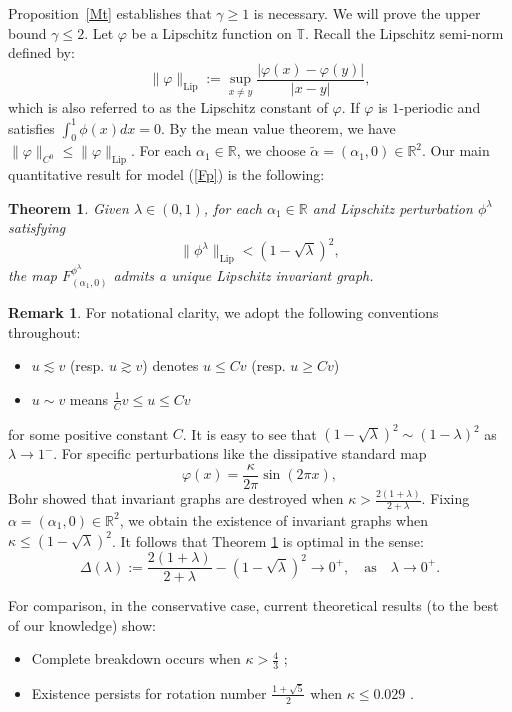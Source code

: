 \documentclass{amsart}
\newcommand{\R}{\mathbb{R}}
\newcommand{\al}{\alpha}
\newcommand{\T}{\mathbb{T}}
\newtheorem{Theorem}{Theorem}
\theoremstyle{definition}
\newtheorem{Remark}[Definition]{Remark}
\begin{document}
\vspace{1ex}





Proposition~\ref{Mt} establishes that $\gamma \geq 1$ is necessary. We will prove the upper bound $\gamma \leq 2$.  Let $\varphi$ be a Lipschitz function on $\T$. Recall the Lipschitz semi-norm defined by:
\[\|\varphi\|_{\mathrm{Lip}}:=\sup_{x\neq y}\frac{|\varphi(x)-\varphi(y)|}{|x-y|},\]
which is also referred to as the Lipschitz constant of $\varphi$. If $\varphi$ is $1$-periodic and satisfies $\int_{0}^1 \phi(x) dx = 0$. By the mean value theorem, we have $\|\varphi\|_{C^0}\leq \|\varphi\|_{\mathrm{Lip}}$. For each $\al_1\in\R$, we choose  $\tilde{\alpha} = (\alpha_1, 0) \in \mathbb{R}^2$. Our main quantitative result for model (\ref{Fp}) is the following:

\begin{Theorem}\label{M2}
Given $\lambda \in (0,1)$, for each $\al_1\in\R$ and  Lipschitz perturbation $\phi^\lambda$ satisfying
\begin{equation}\label{contrac}
\|\phi^\lambda\|_{\mathrm{Lip}} < (1-\sqrt{\lambda})^2,
\end{equation}
the map $F^{\phi^\lambda}_{(\al_1,0)}$ admits a unique Lipschitz invariant graph.
\end{Theorem}

\begin{Remark}
For notational clarity, we adopt the following conventions throughout:
\begin{itemize}
\item $u \lesssim v$ (resp. $u \gtrsim v$) denotes $u \leq Cv$ (resp. $u \geq Cv$)
\item $u \sim v$ means $\frac{1}{C}v \leq u \leq Cv$
\end{itemize}
for some positive constant $C$.
It is easy to see that $(1-\sqrt{\lambda})^2\sim (1-\lambda)^2$ as $\lambda\to 1^-$. For specific perturbations like the dissipative standard map
\begin{equation}\label{contrac33}
\varphi(x) = \frac{\kappa}{2\pi} \sin(2\pi x),
\end{equation}
Bohr \cite{Bo} showed that invariant graphs are destroyed when $\kappa >  \frac{2(1+\lambda)}{2+\lambda}$.  Fixing $\alpha = (\alpha_1, 0) \in \mathbb{R}^2$, we obtain the existence  of invariant graphs when $\kappa \leq (1-\sqrt{\lambda})^2$. It follows that Theorem \ref{M2} is optimal in the sense:
\[\Delta(\lambda):=\frac{2(1+\lambda)}{2+\lambda}-(1-\sqrt{\lambda})^2\to 0^+,\quad \text{as} \quad \lambda\to 0^+.\]


For comparison, in the conservative case, current theoretical results (to the best of our knowledge) show:
\begin{itemize}
\item Complete breakdown occurs when $\kappa > \frac{4}{3}$ \cite{M1};
\item Existence persists for rotation number $\frac{1+\sqrt{5}}{2}$ when $\kappa \leq 0.029$ \cite[Page 197]{H33}.
\end{itemize}
\end{Remark}
\end{document}
